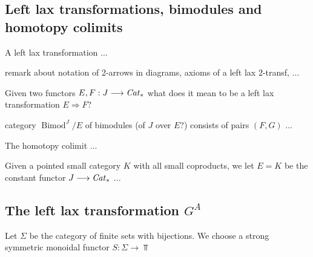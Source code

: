   \subsection{Left lax transformations, bimodules and homotopy colimits}

    \begin{defn}\label{def_left_lax_transformation}
      A left lax transformation ...
    \end{defn}

    \begin{rem}\label{rem_left_lax_transformation}
      remark about notation of 2-arrows in diagrams, axioms of a left lax 2-transf, ...
    \end{rem}

    \begin{rem}\label{rem_left_lax_transform_functors_J_to_Cat}
      Given two functors $E,F: J \longrightarrow \mathit{Cat}_*$ what does it mean to be a left lax transformation $E \Rightarrow F$?
    \end{rem}

    \begin{defn}\label{def_category_of_bimodules}
      category $\operatorname{Bimod}^J / E$ of bimodules (of $J$ over $E$?) consists of pairs $(F,G)$ ...
    \end{defn}

    \begin{defn}\label{def_hocolim}
      The homotopy colimit ...
    \end{defn}

    \begin{rem}\label{rem_bimod_for_constant_functor_and_hocolim}
      Given a pointed small category $K$ with all small coproducts, we let $E = K$ be the constant functor $J \longrightarrow \mathit{Cat}_*$ ...
    \end{rem}

  \subsection{The left lax transformation $G^A$}

    \begin{defn}\label{def_left_lax_transformation_S}
      Let $\Sigma$ be the category of finite sets with bijections. We choose a strong symmetric monoidal functor $S: \Sigma \to \Top$
    \end{defn}

